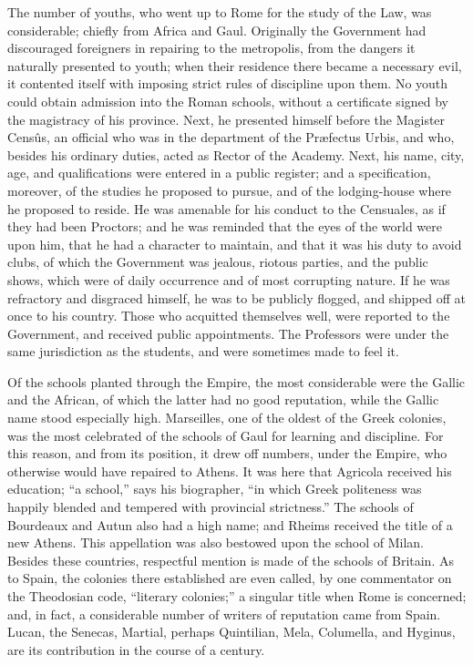 The number of youths, who went up to Rome for the study of the Law,
was considerable; chiefly from Africa and Gaul. Originally the
Government had discouraged foreigners in repairing to the metropolis,
from the dangers it naturally presented to youth; when their residence
there became a necessary evil, it contented itself with imposing
strict rules of discipline upon them. No youth could obtain admission
into the Roman schools, without a certificate signed by the magistracy
of his province. Next, he presented himself before the Magister
Censûs, an official who was in the department of the Præfectus Urbis,
and who, besides his ordinary duties, acted as Rector of the Academy.
Next, his name, city, age, and qualifications were entered in a public
register; and a specification, moreover, of the studies he proposed to
pursue, and of the lodging-house where he proposed to reside. He was
amenable for his conduct to the Censuales, as if they had been
Proctors; and he was reminded that the eyes of the world were upon
him, that he had a character to maintain, and that it was his duty to
avoid clubs, of which the Government was jealous, riotous parties, and
the public shows, which were of daily occurrence and of most
corrupting nature. If he was refractory and disgraced himself, he was
to be publicly flogged, and shipped off at once to his country. Those
who acquitted themselves well, were reported to the Government, and
received public appointments. The Professors were under the same
jurisdiction as the students, and were sometimes made to feel it.

Of the schools planted through the Empire, the most considerable
were the Gallic and the African, of which the latter had no good
reputation, while the Gallic name stood especially high. Marseilles,
one of the oldest of the Greek colonies, was the most celebrated of
the schools of Gaul for learning and discipline. For this reason, and
from its position, it drew off numbers, under the Empire, who
otherwise would have repaired to Athens. It was here that Agricola
received his education; ``a school,'' says his biographer,
``in which Greek politeness was happily blended and tempered with
provincial strictness.'' The schools of Bourdeaux and Autun also
had a high name; and Rheims received the title of a new Athens.
This appellation was also bestowed upon the school of Milan. Besides
these countries, respectful mention is made of the schools of Britain.
As to Spain, the colonies there established are even called, by one
commentator on the Theodosian code, ``literary colonies;'' a
singular title when Rome is concerned; and, in fact, a considerable
number of writers of reputation came from Spain. Lucan, the Senecas,
Martial, perhaps Quintilian, Mela, Columella, and Hyginus, are its
contribution in the course of a century.

